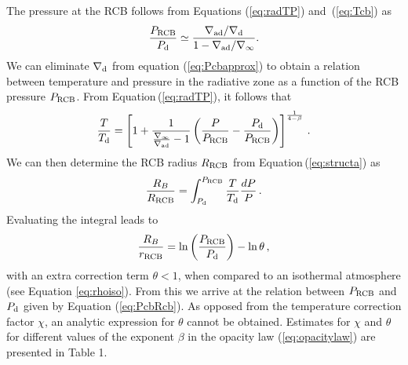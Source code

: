 \documentclass[apj, numberedappendix]{emulateapj}
\newcommand{\Eq}[1]{Equation\,(\ref{#1})}
\newcommand{\Eqs}[2]{Equations (\ref{#1}) and~(\ref{#2})}
\newcommand{\App}[1]{Appendix~\ref{#1}}
\newcommand{\delad}{\nabla_{\rm ad}}
\newcommand{\di}{_{\rm d}}
\newcommand{\cb}{_{\rm RCB}}
\begin{document}
The pressure at the RCB follows from \Eqs{eq:radTP}{eq:Tcb} as
\begin{equation}
\label{eq:Pcbapprox}
{P\cb\over P_{\rm d}} \simeq {\delad/\nabla\di \over 1 - \delad/\nabla_\infty}.
\end{equation} 
 We can eliminate $\nabla\di$ from equation (\ref{eq:Pcbapprox}) to obtain a relation between temperature and pressure in the radiative zone as a function of the RCB pressure $P\cb$. From \Eq{eq:radTP}, it follows that
 \begin{equation}\label{eq:TP}
{T \over T_{\rm d}} = \left[1 + {1 \over {\nabla_\infty \over \delad} - 1} \left({P \over P\cb} -  {P_{\rm d} \over P\cb}\right) \right]^{1 \over 4-\beta}\, .
\end{equation} 
 We can then determine the RCB radius $R\cb$ from \Eq{eq:structa} as 
\begin{equation}\label{eq:RCBint}
{R_B \over R\cb} = \int_{P\di}^{P\cb} {T \over T_{\rm d}} {dP \over P}\, .
\end{equation}
Evaluating the integral leads to 
\begin{equation}\label{eq:Rcb}
{R_B \over r\cb} = \ln \left(P\cb \over P\di \right) - \ln \theta \, ,
\end{equation} 
with an extra correction term $\theta < 1$, when compared to an isothermal atmosphere (see Equation \ref{eq:rhoiso}). From this we arrive at the relation between $P\cb$ and $P\di$ given by Equation (\ref{eq:PcbRcb}). As opposed from the temperature correction factor $\chi$, an analytic expression for  $\theta$ cannot be obtained. Estimates for $\chi$ and $\theta$ for different values of the exponent $\beta$ in the opacity law (\ref{eq:opacitylaw}) are presented in Table 1.


\end{document}
